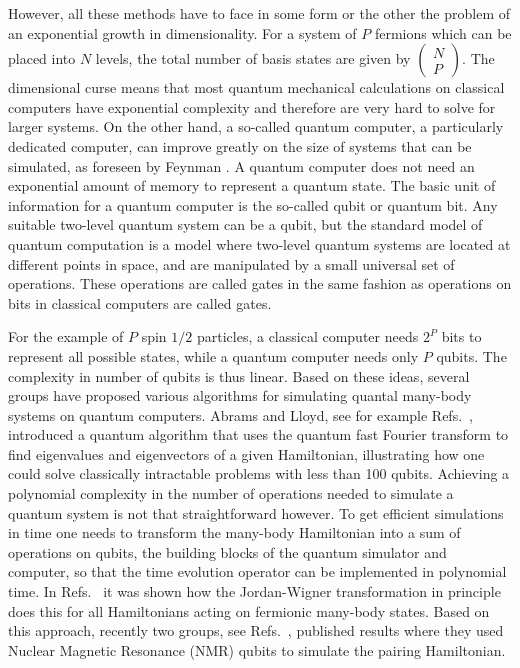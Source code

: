 \documentclass[aps,pra,twocolumn,floatfix]{revtex4}
\begin{document}
However, all these methods have to face in some form or the other the problem of 
an exponential growth in dimensionality. For a system of $P$ fermions
which 
can be placed 
into $N$ levels, the total number of basis states are given by
$\left(\begin{array}{c}N\\P\end{array}\right)$.
The dimensional curse means that most quantum
mechanical calculations on classical computers have exponential
complexity and therefore are very hard to solve for larger systems. On 
the other hand, a so-called 
quantum computer, a particularly dedicated computer,
can improve greatly on the size of systems that can be simulated, as
foreseen by Feynman \cite{feynman1982,feynman1986}. A quantum computer 
does not need
an exponential amount of memory to represent a quantum state.  
The basic unit of information for a  quantum computer 
is the so-called qubit or quantum bit. Any
suitable 
two-level quantum system can be a qubit, but the  
standard model of quantum computation is a model where two-level
quantum systems are located at different points in
space, and are manipulated by a small universal set of  operations.
These operations are called gates in the same fashion as operations on
bits in classical computers are called gates. 

For the example of $P$ spin $1/2$  particles, 
a classical computer needs $2^P$ bits to represent all possible states, while  
a quantum computer needs only $P$ qubits. The complexity in
number of qubits is thus linear.  Based on these ideas, several groups have proposed
various algorithms for simulating quantal many-body systems on quantum computers.
Abrams 
and  Lloyd, see for example Refs.~\cite{lloyd1997,lloyd1999a}, introduced a  
quantum algorithm that uses the quantum fast Fourier transform to find 
eigenvalues and eigenvectors of a given Hamiltonian,
illustrating how one could solve classically intractable problems with  
less than 100 qubits.
Achieving a polynomial complexity in the number of operations needed
to simulate a quantum system is not that straightforward however.
To get efficient simulations in time one
needs to transform the  many-body Hamiltonian into a sum of operations
on qubits, the building blocks of the quantum simulator and computer,
so that the time evolution operator can be implemented in polynomial
time. 
In Refs.~\cite{somma2002,somma2005,ortiz2002} it was shown how the
Jordan-Wigner 
transformation in principle
does this for all Hamiltonians acting on fermionic many-body states.
Based on this approach, recently two groups, see Refs.~\cite{krbrown2006,yang2006}, published 
results where 
they used Nuclear Magnetic Resonance (NMR) qubits to simulate the
pairing Hamiltonian.  
\end{document}
